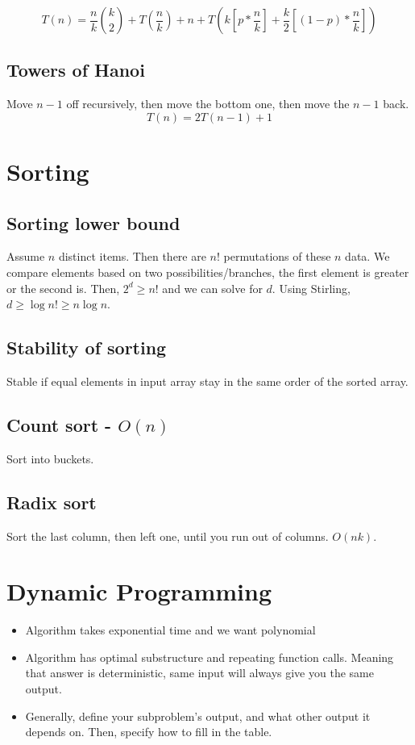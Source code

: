     $$T(n) = \frac{n}{k} \binom{k}{2} +   T\left(\frac{n}{k}\right) + n + T\left(k \left[p * \frac{n}{k}\right]+ \frac{k}{2}\left[(1-p) * \frac{n}{k}\right]\right)$$
    
\subsection{Towers of Hanoi}
Move $n-1$ off recursively, then move the bottom one, then move the $n-1$ back.
$$T(n) = 2T(n-1) + 1$$
    
\section{Sorting}
\subsection{Sorting lower bound}
Assume $n$ distinct items. Then there are $n!$ permutations of these $n$ data. We compare elements based on two possibilities/branches, the first element is greater or the second is. Then, $2^d \geq n!$ and we can solve for $d$. Using Stirling, $d \geq \log n! \geq n\log n$.

\subsection{Stability of sorting}
Stable if equal elements in input array stay in the same order of the sorted array.

\subsection{Count sort - $O(n)$}
Sort into buckets.

\subsection{Radix sort}
Sort the last column, then left one, until you run out of columns. $O(nk)$.


\section{Dynamic Programming}
\begin{itemize}
    \item Algorithm takes exponential time and we want polynomial
    \item Algorithm has optimal substructure and repeating function calls. Meaning that answer is deterministic, same input will always give you the same output.
    \item Generally, define your subproblem's output, and what other output it depends on. Then, specify how to fill in the table.
\end{itemize}
